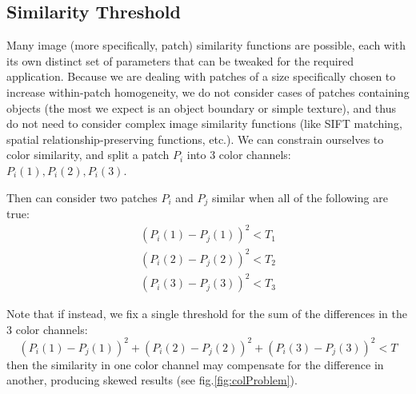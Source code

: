\subsection{Similarity Threshold}

Many image (more specifically, patch) similarity functions are possible, each with its own distinct set of parameters that can be tweaked for the required application. Because we are dealing with patches of a size specifically chosen to increase within-patch homogeneity, we do not consider cases of patches containing objects (the most we expect is an object boundary or simple texture), and thus do not need to consider complex image similarity functions (like SIFT matching, spatial relationship-preserving functions, etc.). We can constrain ourselves to color similarity, and split a patch $P_i$ into 3 color channels: $P_i(1), P_i(2), P_i(3)$. 

Then can consider two patches $P_i$ and $P_j$ similar when all of the following are true:
\begin{align*}
(P_i(1) - P_j(1))^2 < T_1 \\
(P_i(2) - P_j(2))^2 < T_2 \\
(P_i(3) - P_j(3))^2 < T_3
\end{align*}

Note that if instead, we fix a single threshold for the sum of the differences in the 3 color channels: 
\begin{displaymath}
(P_i(1) - P_j(1))^2 + (P_i(2) - P_j(2))^2 + (P_i(3) - P_j(3))^2 < T
\end{displaymath}
then the similarity in one color channel may compensate for the difference in another, producing skewed results (see fig.\ref{fig:colProblem}).




